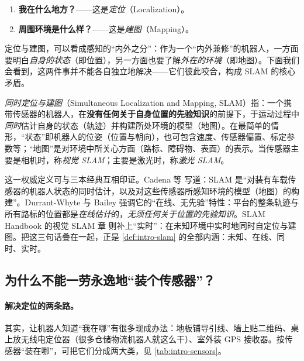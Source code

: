\begin{enumerate}
  \item \textbf{我在什么地方？}——这是\emph{定位}（Localization）。
  \item \textbf{周围环境是什么样？}——这是\emph{建图}（Mapping）。
\end{enumerate}

\noindent 定位与建图，可以看成感知的“内外之分”：作为一个“内外兼修”的机器人，一方面要明白\emph{自身的状态}（即位置），另一方面也要了解\emph{外在的环境}（即地图）。下面我们会看到，这两件事并不能各自独立地解决——它们彼此咬合，构成 SLAM 的核心矛盾。

\begin{definition}\label{def:intro-slam}
\emph{同时定位与建图}（Simultaneous Localization and Mapping, SLAM）指：一个携带传感器的机器人，在\textbf{没有任何关于自身位置的先验知识}的前提下，于运动过程中\emph{同时}估计自身的状态（轨迹）并构建所处环境的模型（地图）\cite{cadena2016past,durrantwhyte2006slam}。在最简单的情形，“状态”即机器人的位姿（位置与朝向），也可包含速度、传感器偏置、标定参数等；“地图”是对环境中所关心方面（路标、障碍物、表面）的表示。当传感器主要是相机时，称\emph{视觉 SLAM}；主要是激光时，称\emph{激光 SLAM}。
\end{definition}

\noindent 这一权威定义可与三本经典互相印证。Cadena 等\cite{cadena2016past} 写道：SLAM 是“对装有车载传感器的机器人状态的同时估计，以及对这些传感器所感知环境的模型（地图）的构建”。Durrant-Whyte 与 Bailey\cite{durrantwhyte2006slam} 强调它的“在线、无先验”特性：平台的整条轨迹与所有路标的位置都是\emph{在线估计}的，\emph{无须任何关于位置的先验知识}。SLAM Handbook 的视觉 SLAM 章\cite{carlone2026handbook} 则补上“实时”：在未知环境中实时地同时自定位与建图。把这三句话叠在一起，正是 \cref{def:intro-slam} 的全部内涵：未知、在线、同时、实时。

\subsection{为什么不能一劳永逸地“装个传感器”？}
\label{sec:intro-sensors}

\paragraph{解决定位的两条路。}
其实，让机器人知道“我在哪”有很多现成办法：地板铺导引线、墙上贴二维码、桌上放无线电定位器（很多仓储物流机器人就这么干）、室外装 GPS 接收器。按传感器“装在哪”，可把它们分成两大类\cite{gaoxiang2019slam14}，见 \cref{tab:intro-sensors}。

